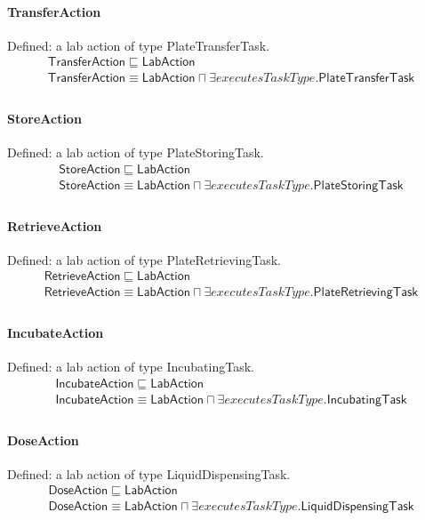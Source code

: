 \documentclass[10pt]{article}
\begin{document}
\paragraph{TransferAction} Defined: a lab action of type PlateTransferTask.
\[\begin{array}{l}
\mathsf{TransferAction} \sqsubseteq  \mathsf{LabAction} \\
\mathsf{TransferAction} \equiv  \mathsf{LabAction} \sqcap  \exists \mathit{executesTaskType}.\mathsf{PlateTransferTask} \\
\end{array}\]
\paragraph{StoreAction} Defined: a lab action of type PlateStoringTask.
\[\begin{array}{l}
\mathsf{StoreAction} \sqsubseteq  \mathsf{LabAction} \\
\mathsf{StoreAction} \equiv  \mathsf{LabAction} \sqcap  \exists \mathit{executesTaskType}.\mathsf{PlateStoringTask} \\
\end{array}\]
\paragraph{RetrieveAction} Defined: a lab action of type PlateRetrievingTask.
\[\begin{array}{l}
\mathsf{RetrieveAction} \sqsubseteq  \mathsf{LabAction} \\
\mathsf{RetrieveAction} \equiv  \mathsf{LabAction} \sqcap  \exists \mathit{executesTaskType}.\mathsf{PlateRetrievingTask} \\
\end{array}\]
\paragraph{IncubateAction} Defined: a lab action of type IncubatingTask.
\[\begin{array}{l}
\mathsf{IncubateAction} \sqsubseteq  \mathsf{LabAction} \\
\mathsf{IncubateAction} \equiv  \mathsf{LabAction} \sqcap  \exists \mathit{executesTaskType}.\mathsf{IncubatingTask} \\
\end{array}\]
\paragraph{DoseAction} Defined: a lab action of type LiquidDispensingTask.
\[\begin{array}{l}
\mathsf{DoseAction} \sqsubseteq  \mathsf{LabAction} \\
\mathsf{DoseAction} \equiv  \mathsf{LabAction} \sqcap  \exists \mathit{executesTaskType}.\mathsf{LiquidDispensingTask} \\
\end{array}\]
\end{document}
